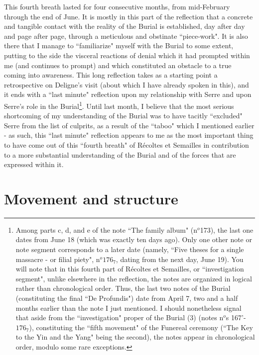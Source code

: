 This fourth breath lasted for four consecutive months, from mid-February through the end of June. It is mostly in this part of the reflection that a concrete and tangible contact with the reality of the Burial is established, day after day and page after page, through a meticulous and obstinate ``piece-work". It is also there that I manage to ``familiarize" myself with the Burial to some extent, putting to the side the visceral reactions of denial which it had prompted within me (and continues to prompt) and which constituted an obstacle to a true coming into awareness. This long reflection takes as a starting point a retrospective on Deligne's visit (about which I have already spoken in this), and it ends with a ``last minute" reflection upon my relationship with Serre and upon Serre's role in the Burial\footnote{Among parts c, d, and e of the note ``The family album" (n$^o$173), the last one dates from June 18 (which was exactly ten days ago). Only one other note or note segment corresponds to a later date (namely, ``Five theses for a single massacre - or filial piety", n$^o 176_7$, dating from the next day, June 19). You will note that in this fourth part of R\'ecoltes et Semailles, or ``investigation segment", unlike elsewhere in the reflection, the notes are organized in logical rather than chronological order. Thus, the last two notes of the Burial (constituting the final ``De Profundis") date from April 7, two and a half months earlier than the note I just mentioned. I should nonetheless signal that aside from the ``investigation" proper of the Burial (3) (notes n$^o$s 167'-$176_7$), constituting the ``fifth movement" of the Funereal ceremony (``The Key to the Yin and the Yang" being the second), the notes appear in chronological order, modulo some rare exceptions.}. Until last month, I believe that the most serious shortcoming of my understanding of the Burial was to have tacitly ``excluded" Serre from the list of culprits, as a result of the ``taboo" which I mentioned earlier - as such, this ``last minute" reflection appears to me as the most important thing to have come out of this ``fourth breath" of R\'ecoltes et Semailles in contribution to a more substantial understanding of the Burial and of the forces that are expressed within it.

\section{Movement and structure}

